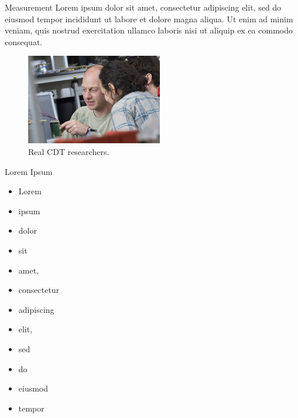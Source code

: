 \documentclass{beamer}
\begin{document}
\begin{frame}[fragile]
\begin{center}
\begin{columns}[T]
\begin{column}{.48\textwidth}

\begin{sectionbox}{Measurement}
Lorem ipsum dolor sit amet, consectetur adipiscing elit, sed do eiusmod tempor
incididunt ut labore et dolore magna aliqua. Ut enim ad minim veniam, quis
nostrud exercitation ullamco laboris nisi ut aliquip ex ea commodo consequat.

\begin{figure}[h]
    \centering
    \includegraphics[width=0.6\linewidth]{researchers.jpg}
    \caption{Real CDT researchers.
    \label{fig:researchers}}
\end{figure}
\end{sectionbox}


\begin{sectionbox}{Lorem Ipsum}
\begin{itemize}
\item Lorem
\item ipsum
\item dolor
\item sit
\item amet,
\item consectetur
\item adipiscing
\item elit,
\item sed
\item do
\item eiusmod
\item tempor
\end{itemize}
\end{sectionbox}

\end{column}
\end{columns}


\end{center}
\end{frame}
\end{document}
